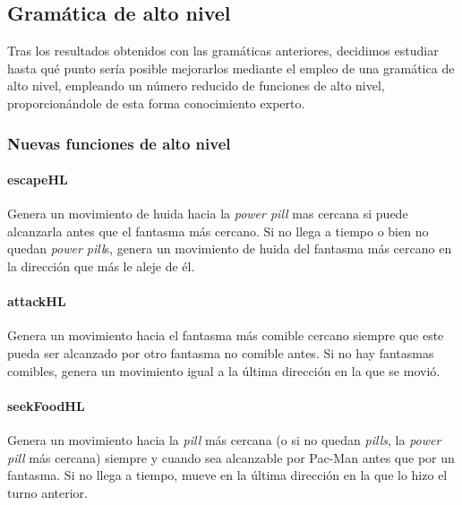 \subsection{Gramática de alto nivel}
Tras los resultados obtenidos con las gramáticas anteriores, decidimos estudiar hasta qué punto sería posible mejorarlos mediante el empleo de una gramática de alto nivel, empleando  un número reducido de funciones de alto nivel, proporcionándole de esta forma conocimiento experto.

\subsubsection{Nuevas funciones de alto nivel}

\paragraph{escapeHL}
Genera un movimiento de huida hacia la \textit{power pill} mas cercana si puede alcanzarla antes que el fantasma más cercano. Si no llega a tiempo o bien no quedan \textit{power pill}s, genera un movimiento de huida del fantasma más cercano en la dirección que más le aleje de él.

\paragraph{attackHL}
Genera un movimiento hacia el fantasma más comible cercano siempre que este pueda ser alcanzado por otro fantasma no comible antes. Si no hay fantasmas comibles, genera un movimiento igual a la última dirección en la que se movió.

\paragraph{seekFoodHL}
Genera un movimiento hacia la \textit{pill} más cercana (o si no quedan \textit{pills}, la \textit{power pill} más cercana) siempre y cuando sea alcanzable por Pac-Man antes que por un fantasma. Si no llega a tiempo, mueve en la última dirección en la que lo hizo el turno anterior.

